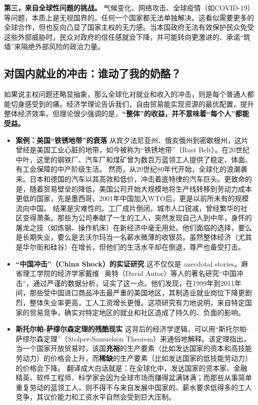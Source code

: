 \textbf{第三，来自全球性问题的挑战。}
气候变化、网络攻击、全球疫情（如COVID-19）等问题，本质上是无视国界的。任何一个国家都无法单独解决。这看似需要更多的全球合作，但也反向凸显了国家主权的无力感。当本国政府无法有效保护民众免受这些外部威胁时，民众对政府的信任感就会下降，并可能转向更激进的、承诺“筑墙”来隔绝外部风险的政治力量。

\subsection{ 对国内就业的冲击：谁动了我的奶酪？}

如果说主权问题还略显抽象，那么全球化对就业和收入的冲击，则是每个普通人都能切身感受到的痛。经济学理论告诉我们，自由贸易能实现资源的最优配置，提升整体经济效率。但理论很少强调的是，\textbf{“整体”的收益，并不意味着“每个人”都能受益。}

\begin{itemize}
\item \textbf{案例：美国“铁锈地带”的衰落}
从宾夕法尼亚州、俄亥俄州到密歇根州，这片曾经是美国工业心脏的地带，如今被称为“铁锈地带”（Rust Belt）。在20世纪中叶，这里的钢铁厂、汽车厂和煤矿曾为数百万蓝领工人提供了稳定、体面、有工会保障的中产阶级生活。
然而，从20世纪80年代开始，全球化的浪潮袭来。日本和德国的汽车以其高效和低价，冲击着底特律的汽车巨头。更致命的是，随着贸易壁垒的降低，美国公司开始大规模地将生产线转移到劳动力成本更低的国家，先是墨西哥，2001年中国加入WTO后，更是以前所未有的规模流向中国。
结果是灾难性的。工厂成片倒闭，城市人口锐减，曾经繁华的社区变得萧条。那些为公司奉献了一生的工人，突然发现自己人到中年，身怀的屠龙之技（如炼钢、操作机床）在新经济中毫无用处。他们面临的选择，要么是长期失业，要么是去沃尔玛当一名薪水微薄的收银员。虽然整体经济（尤其是华尔街和硅谷）在增长，但他们的生活水平却在倒退，尊严也备受打击。

\item \textbf{“中国冲击”（China Shock）的实证研究}
这不仅仅是 anecdotal stories。麻省理工学院的经济学家戴维·奥特（David Autor）等人的著名研究“中国冲击”，通过严谨的数据分析，证实了这一点。他们发现，在1999年到2011年间，那些受中国进口商品冲击最严重的美国地区，其制造业就业岗位下降更剧烈，整体失业率更高，工人工资增长更慢。这项研究有力地说明，来自特定国家的贸易竞争，确实对特定地区的就业和社区造成了持久的、负面的影响。

\item \textbf{斯托尔帕-萨缪尔森定理的残酷现实}
这背后的经济学逻辑，可以用“斯托尔帕-萨缪尔森定理”（Stolper-Samuelson Theorem）来通俗地解释。该定理指出，当一个国家开放贸易时，该国\textbf{充裕}的生产要素（比如发达国家的资本和高技能劳动力）的价格会上升，而\textbf{稀缺}的生产要素（比如发达国家的低技能劳动力）的价格会下降。
翻译成大白话就是：在全球化中，发达国家的资本家、金融精英、软件工程师、科学家会因为全球市场而赚得盆满钵满；而那些从事简单重复劳动的蓝领工人，则不得不与来自发展中国家的、薪水要求低得多的工人竞争，其议价能力和工资水平自然会受到巨大压制。
\end{itemize}

